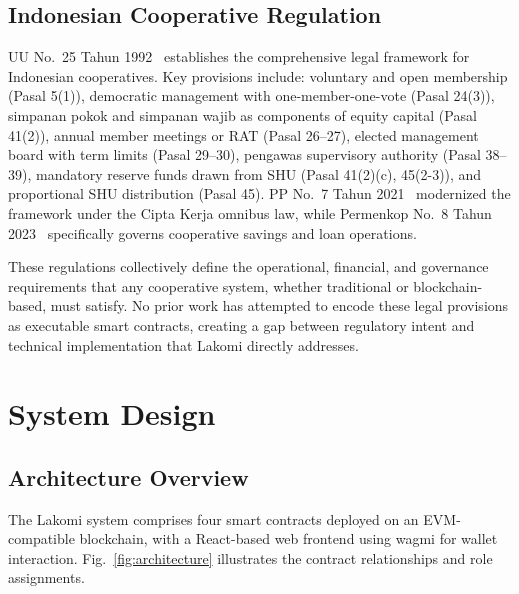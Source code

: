 \documentclass[conference]{IEEEtran}
\begin{document}
\subsection{Indonesian Cooperative Regulation}

UU No.~25 Tahun 1992~\cite{uu251992} establishes the comprehensive legal framework for Indonesian cooperatives. Key provisions include: voluntary and open membership (Pasal 5(1)), democratic management with one-member-one-vote (Pasal 24(3)), simpanan pokok and simpanan wajib as components of equity capital (Pasal 41(2)), annual member meetings or RAT (Pasal 26--27), elected management board with term limits (Pasal 29--30), pengawas supervisory authority (Pasal 38--39), mandatory reserve funds drawn from SHU (Pasal 41(2)(c), 45(2-3)), and proportional SHU distribution (Pasal 45). PP No.~7 Tahun 2021~\cite{pp72021} modernized the framework under the Cipta Kerja omnibus law, while Permenkop No.~8 Tahun 2023~\cite{permenkop82023} specifically governs cooperative savings and loan operations.

These regulations collectively define the operational, financial, and governance requirements that any cooperative system, whether traditional or blockchain-based, must satisfy. No prior work has attempted to encode these legal provisions as executable smart contracts, creating a gap between regulatory intent and technical implementation that Lakomi directly addresses.

\section{System Design}

\subsection{Architecture Overview}

The Lakomi system comprises four smart contracts deployed on an EVM-compatible blockchain, with a React-based web frontend using wagmi for wallet interaction. Fig.~\ref{fig:architecture} illustrates the contract relationships and role assignments.
\end{document}
